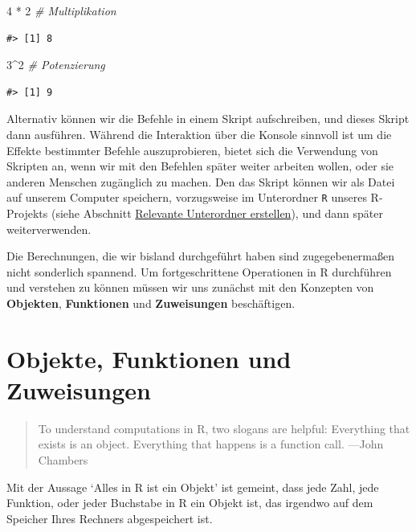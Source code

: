 \documentclass[]{tufte-book}
\newenvironment{Shaded}{}{}
\newcommand{\DecValTok}[1]{\textcolor[rgb]{0.25,0.63,0.44}{#1}}
\newcommand{\StringTok}[1]{\textcolor[rgb]{0.25,0.44,0.63}{#1}}
\newcommand{\CommentTok}[1]{\textcolor[rgb]{0.38,0.63,0.69}{\textit{#1}}}
\newcommand{\OperatorTok}[1]{\textcolor[rgb]{0.40,0.40,0.40}{#1}}
\begin{document}
\begin{Shaded}
\begin{Highlighting}[]
\DecValTok{4} \OperatorTok{*}\StringTok{ }\DecValTok{2}  \CommentTok{# Multiplikation}
\end{Highlighting}
\end{Shaded}

\begin{verbatim}
#> [1] 8
\end{verbatim}

\begin{Shaded}
\begin{Highlighting}[]
\DecValTok{3}\OperatorTok{^}\DecValTok{2}  \CommentTok{# Potenzierung}
\end{Highlighting}
\end{Shaded}

\begin{verbatim}
#> [1] 9
\end{verbatim}

Alternativ können wir die Befehle in einem Skript aufschreiben, und
dieses Skript dann ausführen. Während die Interaktion über die Konsole
sinnvoll ist um die Effekte bestimmter Befehle auszuprobieren, bietet
sich die Verwendung von Skripten an, wenn wir mit den Befehlen später
weiter arbeiten wollen, oder sie anderen Menschen zugänglich zu machen.
Den das Skript können wir als Datei auf unserem Computer speichern,
vorzugsweise im Unterordner \texttt{R} unseres R-Projekts (siehe
Abschnitt \protect\hyperlink{unterordner}{Relevante Unterordner
erstellen}), und dann später weiterverwenden.

Die Berechnungen, die wir bisland durchgeführt haben sind
zugegebenermaßen nicht sonderlich spannend. Um fortgeschrittene
Operationen in R durchführen und verstehen zu können müssen wir uns
zunächst mit den Konzepten von \textbf{Objekten}, \textbf{Funktionen}
und \textbf{Zuweisungen} beschäftigen.

\section{Objekte, Funktionen und
Zuweisungen}\label{objekte-funktionen-und-zuweisungen}

\begin{quote}
To understand computations in R, two slogans are helpful: Everything
that exists is an object. Everything that happens is a function call.
---John Chambers
\end{quote}

Mit der Aussage `Alles in R ist ein Objekt' ist gemeint, dass jede Zahl,
jede Funktion, oder jeder Buchstabe in R ein Objekt ist, das irgendwo
auf dem Speicher Ihres Rechners abgespeichert ist.
\end{document}
